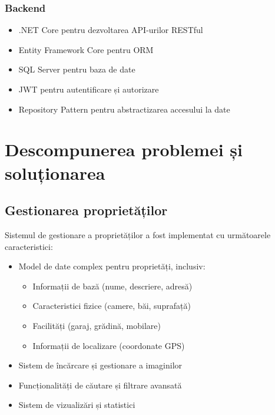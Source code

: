 \documentclass[12pt,a4paper]{report}
\begin{document}
\subsubsection{Backend}
\begin{itemize}
    \item .NET Core pentru dezvoltarea API-urilor RESTful
    \item Entity Framework Core pentru ORM
    \item SQL Server pentru baza de date
    \item JWT pentru autentificare și autorizare
    \item Repository Pattern pentru abstractizarea accesului la date
\end{itemize}

\section{Descompunerea problemei și soluționarea}
\subsection{Gestionarea proprietăților}
Sistemul de gestionare a proprietăților a fost implementat cu următoarele caracteristici:
\begin{itemize}
    \item Model de date complex pentru proprietăți, inclusiv:
    \begin{itemize}
        \item Informații de bază (nume, descriere, adresă)
        \item Caracteristici fizice (camere, băi, suprafață)
        \item Facilități (garaj, grădină, mobilare)
        \item Informații de localizare (coordonate GPS)
    \end{itemize}
    \item Sistem de încărcare și gestionare a imaginilor
    \item Funcționalități de căutare și filtrare avansată
    \item Sistem de vizualizări și statistici
\end{itemize}
\end{document}
